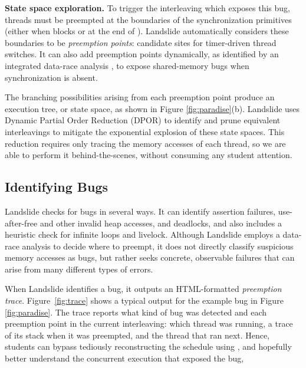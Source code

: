 {\bf State space exploration.}
To trigger the interleaving which exposes this bug, threads must be preempted at the boundaries of the synchronization primitives (either when  blocks or at the end of ).
Landslide automatically considers these boundaries to be {\em preemption points}: candidate sites for timer-driven thread switches.
It can also add preemption points dynamically,
as identified by an integrated data-race analysis \cite{tsan,fasttrack},
to expose shared-memory bugs when synchronization is absent.

The branching possibilities arising from each preemption point produce an execution tree, or state space,
as shown in Figure \ref{fig:paradise}(b).
Landslide uses Dynamic Partial Order Reduction (DPOR) \cite{dpor} to identify and prune equivalent interleavings
to mitigate the exponential explosion of these state spaces.
This reduction requires only tracing the memory accesses of each thread,
so we are able to perform it behind-the-scenes, without consuming any student attention.

\subsection{Identifying Bugs}

Landslide checks for bugs in several ways.
It can identify assertion failures, use-after-free and other invalid heap accesses, and
deadlocks, and also includes a heuristic check for infinite loops and livelock.
Although Landslide employs a data-race analysis to decide where to preempt,
it does not directly classify suspicious memory accesses as bugs,
but rather seeks concrete, observable failures that can arise from many different types of errors.

When Landslide identifies a bug, it outputs an HTML-formatted
{\em preemption trace}.
Figure~\ref{fig:trace} shows a typical output for the example bug in Figure \ref{fig:paradise}.
The trace reports what kind of bug was detected
and each preemption point in the current interleaving:
which thread was running, a trace of its stack when it was preempted, and the thread that ran next.
Hence, students can bypass tediously reconstructing the schedule using ,
and hopefully better understand the concurrent execution that exposed the bug,

